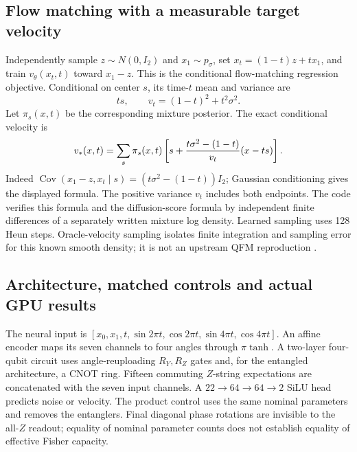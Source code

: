 \documentclass[11pt]{article}
\theoremstyle{definition}\newtheorem{definition}[theorem]{Definition}
\theoremstyle{remark}\newtheorem{remark}[theorem]{Remark}
\begin{document}
\subsection{Flow matching with a measurable target velocity}
Independently sample $z\sim N(0,I_2)$ and $x_1\sim p_\sigma$, set
$x_t=(1-t)z+tx_1$, and train $v_\theta(x_t,t)$ toward $x_1-z$.
This is the conditional flow-matching regression objective. Conditional on
center $s$, its time-$t$ mean and variance are
\[
 ts,\qquad v_t=(1-t)^2+t^2\sigma^2.
\]
Let $\pi_s(x,t)$ be the corresponding mixture posterior. The exact conditional
velocity is
\[
 v_*(x,t)=\sum_s\pi_s(x,t)\left[
 s+{t\sigma^2-(1-t)\over v_t}(x-ts)\right].
\]
Indeed $\operatorname{Cov}(x_1-z,x_t\mid s)=
(t\sigma^2-(1-t))I_2$; Gaussian conditioning gives the displayed formula.
The positive variance $v_t$ includes both endpoints. The code verifies this
formula and the diffusion-score formula by independent finite differences
of a separately written mixture log density. Learned sampling uses 128 Heun
steps. Oracle-velocity sampling isolates finite integration and sampling
error for this known smooth density; it is not an upstream QFM reproduction
\cite{LFQFM}.

\subsection{Architecture, matched controls and actual GPU results}
The neural input is
$[x_0,x_1,t,\sin2\pi t,\cos2\pi t,\sin4\pi t,\cos4\pi t]$.
An affine encoder maps its seven channels to four angles through $\pi\tanh$.
A two-layer four-qubit circuit uses angle-reuploading $R_Y,R_Z$ gates and,
for the entangled architecture, a CNOT ring. Fifteen commuting $Z$-string
expectations are concatenated with the seven input channels. A
$22\to64\to64\to2$ SiLU head predicts noise or velocity. The product control
uses the same nominal parameters and removes the entanglers. Final diagonal
phase rotations are invisible to the all-$Z$ readout; equality of nominal
parameter counts does not establish equality of effective Fisher capacity.
\end{document}
